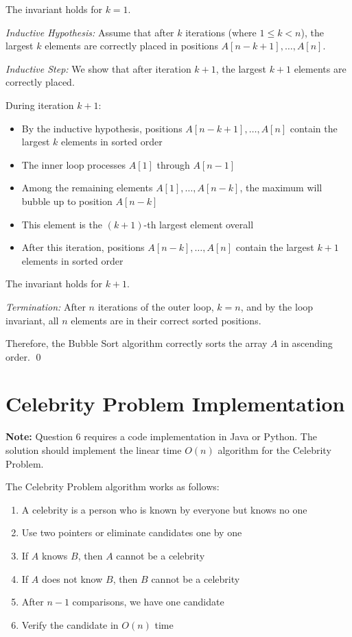 \documentclass[12pt,a4paper]{article}
\begin{document}
The invariant holds for $k=1$.

\textit{Inductive Hypothesis:} Assume that after $k$ iterations (where $1 \leq k < n$), the largest $k$ elements are correctly placed in positions $A[n-k+1], \ldots, A[n]$.

\textit{Inductive Step:} We show that after iteration $k+1$, the largest $k+1$ elements are correctly placed.

During iteration $k+1$:
\begin{itemize}
    \item By the inductive hypothesis, positions $A[n-k+1], \ldots, A[n]$ contain the largest $k$ elements in sorted order
    \item The inner loop processes $A[1]$ through $A[n-1]$
    \item Among the remaining elements $A[1], \ldots, A[n-k]$, the maximum will bubble up to position $A[n-k]$
    \item This element is the $(k+1)$-th largest element overall
    \item After this iteration, positions $A[n-k], \ldots, A[n]$ contain the largest $k+1$ elements in sorted order
\end{itemize}

The invariant holds for $k+1$.

\textit{Termination:} After $n$ iterations of the outer loop, $k=n$, and by the loop invariant, all $n$ elements are in their correct sorted positions.

Therefore, the Bubble Sort algorithm correctly sorts the array $A$ in ascending order. \qed

\section{Celebrity Problem Implementation}

\textbf{Note:} Question 6 requires a code implementation in Java or Python. The solution should implement the linear time $O(n)$ algorithm for the Celebrity Problem.

The Celebrity Problem algorithm works as follows:
\begin{enumerate}
    \item A celebrity is a person who is known by everyone but knows no one
    \item Use two pointers or eliminate candidates one by one
    \item If $A$ knows $B$, then $A$ cannot be a celebrity
    \item If $A$ does not know $B$, then $B$ cannot be a celebrity
    \item After $n-1$ comparisons, we have one candidate
    \item Verify the candidate in $O(n)$ time
\end{enumerate}
\end{document}
